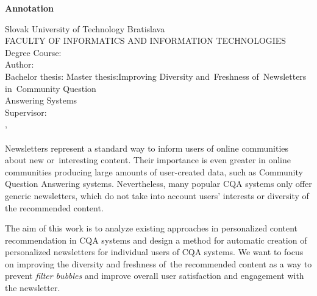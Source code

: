 \afterpage{\blankpage}
\newpage
\thispagestyle{plain}
\begin{center}
\begin{Large}
\textbf{Annotation} \\
\end{Large}
\end{center}
Slovak University of Technology Bratislava
\vspace*{2mm}\\FACULTY OF INFORMATICS AND INFORMATION TECHNOLOGIES
\vspace*{2mm}\\
\noindent
Degree Course:~\ProgramEN
\vspace*{2mm}\\
\noindent
Author:\hspace*{14.5mm}\AuthorEN
\vspace*{2mm}\\
{
	{Bachelor thesis: }\TitleEN
}
{
	{Master thesis:\hspace*{4mm}}Improving Diversity and~Freshness of~Newsletters in~Community Question\\
    \hspace*{27.5mm}Answering Systems
}
\vspace*{2mm}\\
Supervisor: \hspace*{7mm}\SupervisorEN
\vspace*{2mm}\\\Year, \MonthEN\\
\noindent
\\
Newsletters represent a standard way to inform users of online communities about new or~interesting content.
Their importance is even greater in online communities producing large amounts of user-created data, such as
Community Question Answering systems.
Nevertheless, many popular CQA systems only offer generic newsletters, which do not take into account users’ interests
or diversity of the recommended content.

The aim of this work is to analyze existing approaches in personalized content recommendation in CQA systems and design a method for automatic
creation of personalized newsletters for individual users of CQA systems. We want to focus on improving the diversity and freshness of~the
recommended content as a way to prevent \emph{filter bubbles} and improve overall user satisfaction and engagement with the newsletter.

\afterpage{\blankpage}
